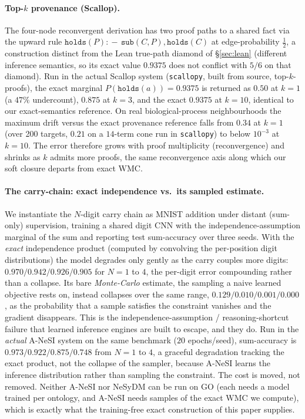 \documentclass[letterpaper]{article}
\newcommand{\WMC}{\ensuremath{\mathrm{WMC}}}
\begin{document}
\paragraph{Top-$k$ provenance (Scallop).}
The four-node reconvergent derivation has two proof paths to a shared fact via the upward rule $\texttt{holds}(P)\!:\!-\,\texttt{sub}(C,P),\texttt{holds}(C)$ at edge-probability $\tfrac12$, a construction distinct from the Lean true-path diamond of \S\ref{sec:lean} (different inference semantics, so its exact value $0.9375$ does not conflict with $5/6$ on that diamond). Run in the actual Scallop system (\texttt{scallopy}, built from source, top-$k$-proofs), the exact marginal $P(\texttt{holds}(a))=0.9375$ is returned as $0.50$ at $k{=}1$ (a $47\%$ undercount), $0.875$ at $k{=}3$, and the exact $0.9375$ at $k{=}10$, identical to our exact-semantics reference. On real biological-process neighbourhoods the maximum drift versus the exact provenance reference falls from $0.34$ at $k{=}1$ (over 200 targets, $0.21$ on a $14$-term cone run in \texttt{scallopy}) to below $10^{-3}$ at $k{=}10$. The error therefore grows with proof multiplicity (reconvergence) and shrinks as $k$ admits more proofs, the same reconvergence axis along which our soft closure departs from exact $\WMC$.

\paragraph{The carry-chain: exact independence vs.\ its sampled estimate.}
We instantiate the $N$-digit carry chain as MNIST addition under distant (sum-only) supervision,
training a shared digit CNN with the independence-assumption marginal of the sum and reporting
test sum-accuracy over three seeds. With the \emph{exact} independence product (computed by
convolving the per-position digit distributions) the model degrades only gently as the carry
couples more digits: $0.970/0.942/0.926/0.905$ for $N{=}1$ to $4$, the per-digit error
compounding rather than a collapse. Its bare \emph{Monte-Carlo} estimate, the sampling a naive
learned objective rests on, instead collapses over the same range, $0.129/0.010/0.001/0.000$,
as the probability that a sample satisfies the constraint vanishes and the gradient disappears.
This is the independence-assumption / reasoning-shortcut failure
\citep{vankrieken2024independence,marconato2023reasoningshortcuts} that learned inference engines
are built to escape, and they do. Run in the \emph{actual} A-NeSI system on the same benchmark
($20$ epochs/seed), sum-accuracy is $0.973/0.922/0.875/0.748$ from $N{=}1$ to $4$, a graceful
degradation tracking the exact product, not the collapse of the sampler, because A-NeSI learns the
inference distribution rather than sampling the constraint. The cost is moved, not removed. Neither
A-NeSI nor NeSyDM \citep{vankrieken2025nesydm} can be run on GO (each needs a model trained per
ontology, and A-NeSI needs samples of the exact $\WMC$ we compute), which is exactly what the
training-free exact construction of this paper supplies.
\end{document}
